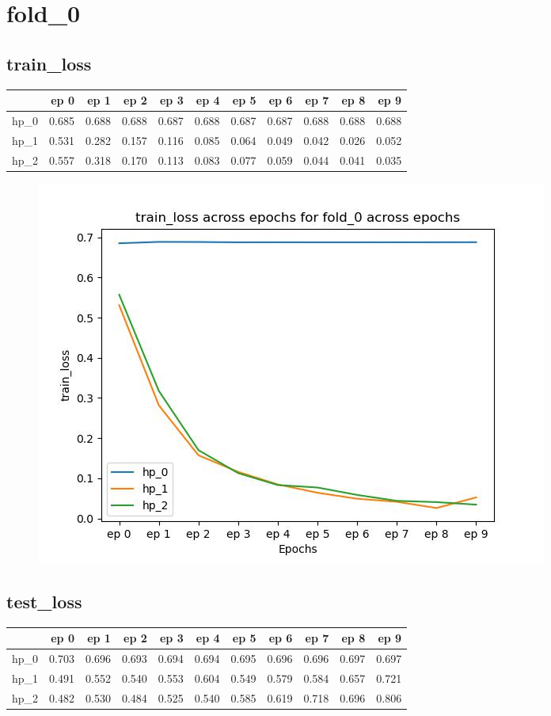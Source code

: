 \documentclass{article}
\begin{document}
\section{fold\_0}
\subsection{train\_loss}
\begin{tabular}{lrrrrrrrrrr}
\toprule
{} &   ep 0 &   ep 1 &   ep 2 &   ep 3 &   ep 4 &   ep 5 &   ep 6 &   ep 7 &   ep 8 &   ep 9 \\
\midrule
hp\_0 &  0.685 &  0.688 &  0.688 &  0.687 &  0.688 &  0.687 &  0.687 &  0.688 &  0.688 &  0.688 \\
hp\_1 &  0.531 &  0.282 &  0.157 &  0.116 &  0.085 &  0.064 &  0.049 &  0.042 &  0.026 &  0.052 \\
hp\_2 &  0.557 &  0.318 &  0.170 &  0.113 &  0.083 &  0.077 &  0.059 &  0.044 &  0.041 &  0.035 \\
\bottomrule
\end{tabular}

\begin{figure}[H]
\includegraphics[scale = 0.75]{fold_0/train_loss}
\end{figure}
\subsection{test\_loss}
\begin{tabular}{lrrrrrrrrrr}
\toprule
{} &   ep 0 &   ep 1 &   ep 2 &   ep 3 &   ep 4 &   ep 5 &   ep 6 &   ep 7 &   ep 8 &   ep 9 \\
\midrule
hp\_0 &  0.703 &  0.696 &  0.693 &  0.694 &  0.694 &  0.695 &  0.696 &  0.696 &  0.697 &  0.697 \\
hp\_1 &  0.491 &  0.552 &  0.540 &  0.553 &  0.604 &  0.549 &  0.579 &  0.584 &  0.657 &  0.721 \\
hp\_2 &  0.482 &  0.530 &  0.484 &  0.525 &  0.540 &  0.585 &  0.619 &  0.718 &  0.696 &  0.806 \\
\bottomrule
\end{tabular}
\end{document}
